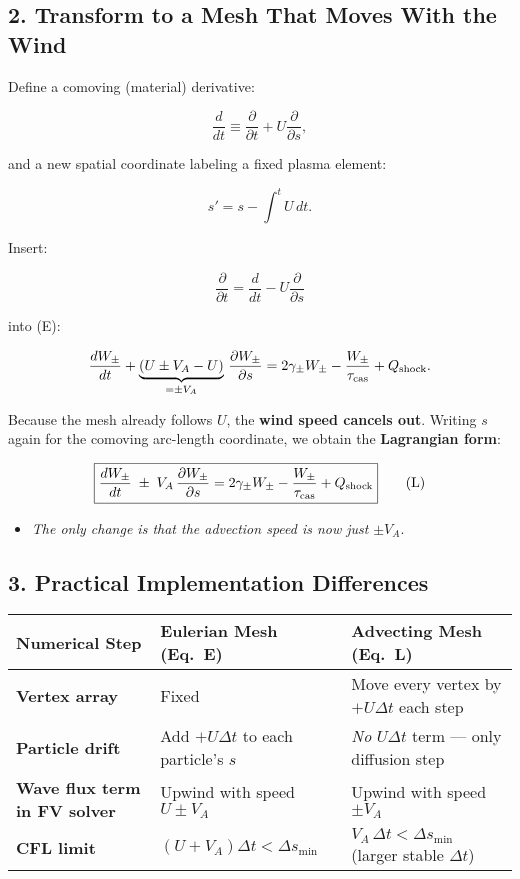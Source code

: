 \subsection*{2. Transform to a Mesh That Moves With the Wind}

Define a comoving (material) derivative:

\[
\frac{d}{dt}\equiv
\frac{\partial}{\partial t}
+U\frac{\partial}{\partial s},
\]

and a new spatial coordinate labeling a fixed plasma element:

\[
s' = s - \int^t U\,dt.
\]

Insert:

\[
\frac{\partial}{\partial t} = \frac{d}{dt} - U\frac{\partial}{\partial s}
\]

into (E):

\[
\frac{dW_\pm}{dt}
+\underbrace{\left(U\pm V_A - U\right)}_{= \pm V_A}\,
  \frac{\partial W_\pm}{\partial s}
=2\gamma_\pm W_\pm-\frac{W_\pm}{\tau_{\rm cas}}+Q_{\rm shock}.
\]

Because the mesh already follows $U$, the \textbf{wind speed cancels out}. Writing $s$ again for the comoving arc-length coordinate, we obtain the \textbf{Lagrangian form}:

\begin{equation}
\boxed{%
\frac{dW_\pm}{dt}
\;\pm\;V_A\,\frac{\partial W_\pm}{\partial s}
=2\gamma_\pm W_\pm
-\frac{W_\pm}{\tau_{\rm cas}}
+Q_{\text{shock}} } \tag{L}
\end{equation}

\begin{itemize}
\item \textit{The only change is that the advection speed is now just} $\pm V_A$.
\end{itemize}

\subsection*{3. Practical Implementation Differences}

\begin{table}[h!]
\centering
\begin{tabular}{|p{4cm}|p{5.5cm}|p{5.5cm}|}
\hline
\textbf{Numerical Step} & \textbf{Eulerian Mesh (Eq.~E)} & \textbf{Advecting Mesh (Eq.~L)} \\
\hline
\textbf{Vertex array} & Fixed & Move every vertex by $+U\Delta t$ each step \\
\hline
\textbf{Particle drift} & Add $+U\Delta t$ to each particle’s $s$ & \textit{No} $U\Delta t$ term — only diffusion step \\
\hline
\textbf{Wave flux term in FV solver} & Upwind with speed $U\pm V_A$ & Upwind with speed $\pm V_A$ \\
\hline
\textbf{CFL limit} & $\left(U + V_A\right)\Delta t < \Delta s_{\min}$ & $V_A\,\Delta t < \Delta s_{\min}$ (larger stable $\Delta t$) \\
\hline
\end{tabular}
\end{table}

